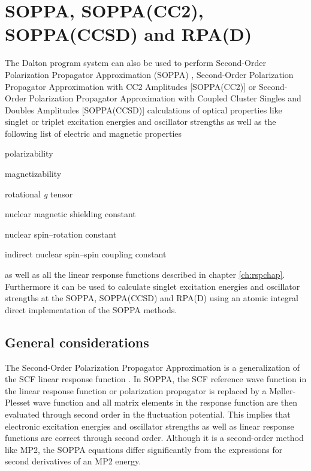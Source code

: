 \chapter{SOPPA, SOPPA(CC2), SOPPA(CCSD) and RPA(D)}\label{ch:soppa}

The Dalton program system can also be used to perform Second-Order
Polarization Propagator Approximation (SOPPA) 
\cite{esnpjjodjcp73,mjpekdtehjajjojcp,spascpl260,tejospastcan100,spas037},
Second-Order Polarization Propagator Approximation with CC2 Amplitudes
[SOPPA(CC2)]  \cite{spas097} or Second-Order
Polarization Propagator Approximation with Coupled Cluster Singles and
Doubles Amplitudes [SOPPA(CCSD)]  \cite{soppaccsd}
calculations of optical properties like singlet or triplet excitation
energies and oscillator
strengths as well as the following list of
electric and magnetic properties
\begin{center}
\begin{list}{}{}
\item polarizability
\item magnetizability
\item rotational {\em g} tensor
\item nuclear magnetic shielding constant
\item nuclear spin--rotation constant
\item indirect nuclear spin--spin coupling constant
\end{list}
\end{center}
as well as all the linear response functions described in chapter
\ref{ch:rspchap}. Furthermore it can be used to calculate singlet
excitation energies and oscillator
strengths at the SOPPA,\cite{spas037}
SOPPA(CCSD) \cite{spas089} and RPA(D) \cite{spas025}
using an atomic integral direct implementation of the SOPPA methods.


\section{General considerations}\label{sec:soppageneral}

The Second-Order Polarization Propagator Approximation is a
generalization of the SCF linear response function \cite{esnpjjodjcp73,
jopjdycpr2, mjpekdtehjajjojcp, spas037}. In SOPPA, the SCF reference
wave function in the linear response function or polarization
propagator is replaced by a M{\o}ller-Plesset wave function and all
matrix elements in the response function are then evaluated through
second order in the fluctuation potential. This implies that electronic
excitation energies and oscillator strengths as well as linear response
functions are correct through second order. Although it is a
second-order method like MP2, the SOPPA equations differ significantly
from the expressions for second derivatives of an MP2 energy.

